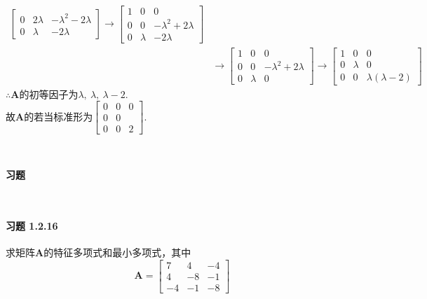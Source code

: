 \documentclass[12pt, a4paper, oneside, fontset=none]{ctexart}
\begin{document}
\begin{align*}
\begin{bmatrix}
                                     0 & 2\lambda & -\lambda^2 - 2\lambda \\
                                     0 & \lambda  & -2\lambda
                                 \end{bmatrix} \to \begin{bmatrix}
                                                       1 & 0       & 0                   \\
                                                       0 & 0       & -\lambda^2+2\lambda \\
                                                       0 & \lambda & -2\lambda
                                                   \end{bmatrix}    \\
                           & \to \begin{bmatrix}
                                     1 & 0       & 0                     \\
                                     0 & 0       & -\lambda^2 + 2\lambda \\
                                     0 & \lambda & 0
                                 \end{bmatrix} \to \begin{bmatrix}
                                                       1 & 0       & 0                    \\
                                                       0 & \lambda & 0                    \\
                                                       0 & 0       & \lambda(\lambda - 2)
                                                   \end{bmatrix}
\end{align*}
$\therefore \bm{A}$的初等因子为$\lambda,\ \lambda,\ \lambda - 2.$ \\
故$\bm{A}$的若当标准形为$
    \begin{bmatrix}
        0 & 0 & 0 \\
        0 & 0 &   \\
        0 & 0 & 2
    \end{bmatrix}.
$

\par \ \par

\centerline{\large{\textbf{习题}}} \ \par

\paragraph*{习题 1.2.16} 求矩阵$\bm{A}$的特征多项式和最小多项式，其中
\[
    \bm{A} = \begin{bmatrix}
        7  & 4  & -4 \\
        4  & -8 & -1 \\
        -4 & -1 & -8
    \end{bmatrix}
\]
\end{document}
